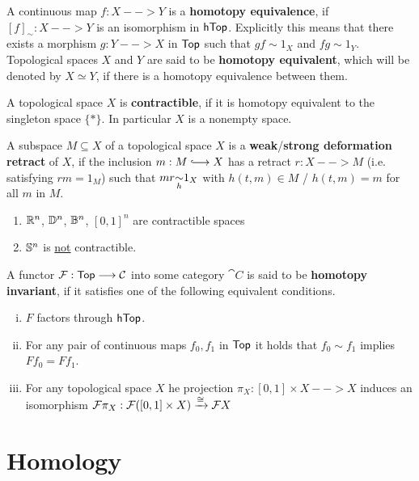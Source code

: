 \begin{definition}
	A continuous map $f:X-->Y$ is a \textbf{homotopy equivalence}, if $[f]_\sim: X --> Y$ is an isomorphism in $\ncat{hTop}$. Explicitly this means that there exists a morphism $g:Y --> X$ in $\ncat{Top}$ such that $gf \sim 1_X$ and $fg \sim 1_Y$. Topological spaces $X$ and $Y$ are said to be \textbf{homotopy equivalent}, which will be denoted by $X \simeq Y$, if there is a homotopy equivalence between them.

	A topological space $X$ is \textbf{contractible}, if it is homotopy equivalent to the singleton space $\{*\}$. In particular $X$ is a nonempty space.

	A subspace $M \subseteq X$ of a topological space $X$ is a \textbf{weak}/\textbf{strong deformation retract} of $X$, if the inclusion $m:M \longrightincl X$ has a retract $r:X --> M$ (i.e. satisfying $rm = 1_M$) such that $mr \smash{\underset{h}{\sim}} 1_X$ with $h(t,m) \in M$ / $h(t,m) = m$ for all $m$ in $M$.
\end{definition}

\begin{example}\vspace{-2em}
	\begin{enumerate}
		\item{
			$\R^n$, $\D^n$, $\B^n$, $[0,1]^n$ are contractible spaces
		}
		\item{
			$\S^n$ is \underline{not} contractible.
		}
	\end{enumerate}
\end{example}

\begin{definition}
	A functor $\fun{F}:\ncat{Top} --> \cat{C}$ into some category $\cat{C}$ is said to be \textbf{homotopy invariant}, if it satisfies one of the following equivalent conditions.
	\begin{enumerate}[(i)]
		\item{
			$F$ factors through $\ncat{hTop}$.
		}
		\item{
			For any pair of continuous maps $f_0,f_1$ in $\ncat{Top}$ it holds that $f_0 \sim f_1$ implies $Ff_0 = Ff_1$.
		}
		\item{
			For any topological space $X$ he projection $\pi_X:[0,1]\times X --> X$ induces an isomorphism $\fun{F}\pi_X: \fun{F}([0,1]\times X) \xrightarrow{\isom} \fun{F}X$
		}
	\end{enumerate}
\end{definition}

\newpage
\section{Homology}

